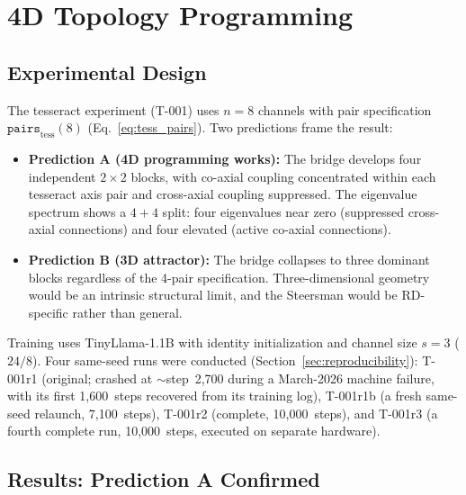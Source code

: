 \section{4D Topology Programming}
\label{sec:tesseract}

\subsection{Experimental Design}

The tesseract experiment (T-001) uses $n = 8$ channels with pair
specification $\texttt{pairs}_{\text{tess}}(8)$
(Eq.~\ref{eq:tess_pairs}). Two predictions frame the result:

\begin{itemize}
  \item \textbf{Prediction A (4D programming works):} The bridge
    develops four independent $2 \times 2$ blocks, with co-axial
    coupling concentrated within each tesseract axis pair and
    cross-axial coupling suppressed. The eigenvalue spectrum shows a
    $4{+}4$ split: four eigenvalues near zero (suppressed cross-axial
    connections) and four elevated (active co-axial connections).
  \item \textbf{Prediction B (3D attractor):} The bridge collapses to
    three dominant blocks regardless of the 4-pair specification.
    Three-dimensional geometry would be an intrinsic structural limit,
    and the Steersman would be RD-specific rather than general.
\end{itemize}

Training uses TinyLlama-1.1B with identity initialization and
channel size $s = 3$ ($24 / 8$). Four same-seed runs were conducted
(Section~\ref{sec:reproducibility}): T-001r1 (original; crashed at
${\sim}$step~2{,}700 during a March-2026 machine failure, with its
first 1{,}600~steps recovered from its training log), T-001r1b (a
fresh same-seed relaunch, 7{,}100~steps), T-001r2 (complete,
10{,}000~steps), and T-001r3 (a fourth complete run, 10{,}000~steps,
executed on separate hardware).

\subsection{Results: Prediction A Confirmed}

